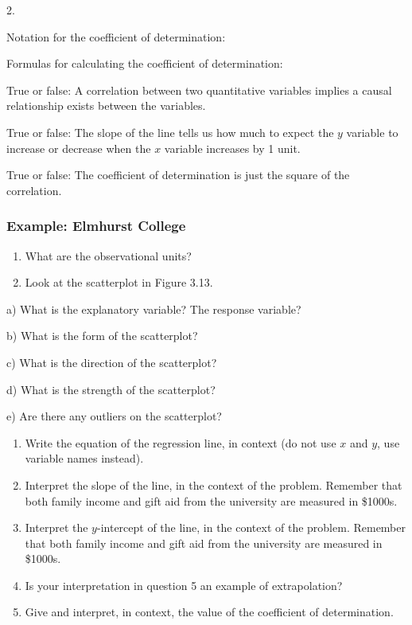 \documentclass[
]{report}
\newcommand{\rgs}{\vspace{12pt}} %
\newcommand{\rgi}{\hspace{24pt}}  %
\begin{document}
\rgi 2.
\rgs

Notation for the coefficient of determination:
\rgs

Formulas for calculating the coefficient of determination:
\rgs

True or false: A correlation between two quantitative variables implies a causal relationship exists between the variables.

True or false: The slope of the line tells us how much to expect the \(y\) variable to increase or decrease when the \(x\) variable increases by 1 unit.

True or false: The coefficient of determination is just the square of the correlation.

\hypertarget{example-elmhurst-college}{%
\subsubsection*{Example: Elmhurst College}\label{example-elmhurst-college}}

\begin{enumerate}
\def\labelenumi{\arabic{enumi}.}
\item
  What are the observational units?\\
  \rgs
\item
  Look at the scatterplot in Figure 3.13.
\end{enumerate}

\rgi a) What is the explanatory variable? The response variable?\\
\rgs

\rgi b) What is the form of the scatterplot?\\
\rgs

\rgi c) What is the direction of the scatterplot?
\rgs

\rgi d) What is the strength of the scatterplot?
\rgs

\rgi e) Are there any outliers on the scatterplot?\\
\rgs

\begin{enumerate}
\def\labelenumi{\arabic{enumi}.}
\setcounter{enumi}{2}
\item
  Write the equation of the regression line, in context (do not use \(x\) and \(y\), use variable names instead).
  \rgs
\item
  Interpret the slope of the line, in the context of the problem. Remember that both family income and gift aid from the university are measured in \$1000s.
  \rgs
  \rgs
\item
  Interpret the \(y\)-intercept of the line, in the context of the problem. Remember that both family income and gift aid from the university are measured in \$1000s.
  \rgs
  \rgs
\item
  Is your interpretation in question 5 an example of extrapolation?
  \rgs
\item
  Give and interpret, in context, the value of the coefficient of determination.
  \rgs
  \rgs
\end{enumerate}
\end{document}

